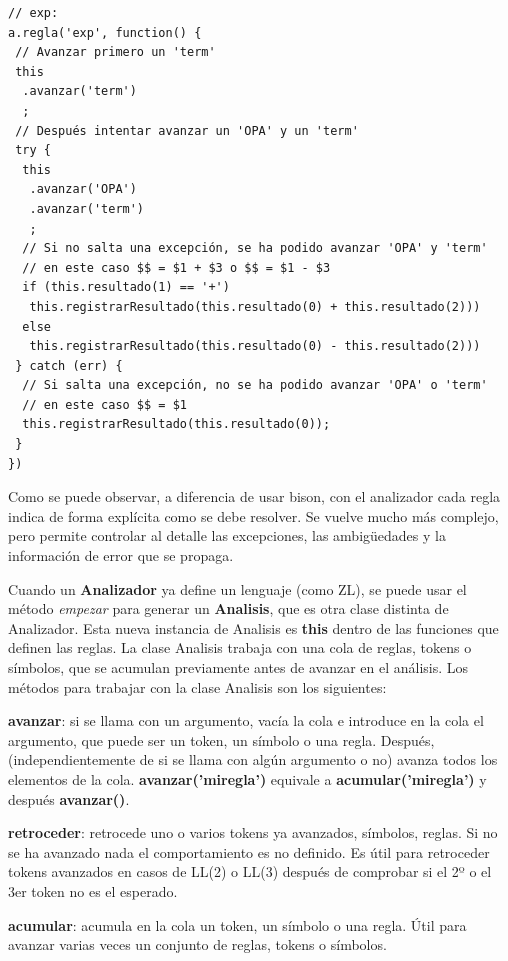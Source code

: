 \documentclass{report}
\begin{document}
	\begin{BVerbatim}
// exp:
a.regla('exp', function() {
 // Avanzar primero un 'term'
 this
  .avanzar('term')
  ;
 // Después intentar avanzar un 'OPA' y un 'term'
 try {
  this
   .avanzar('OPA')
   .avanzar('term')
   ;
  // Si no salta una excepción, se ha podido avanzar 'OPA' y 'term'
  // en este caso $$ = $1 + $3 o $$ = $1 - $3 
  if (this.resultado(1) == '+')
   this.registrarResultado(this.resultado(0) + this.resultado(2)))
  else
   this.registrarResultado(this.resultado(0) - this.resultado(2)))
 } catch (err) {
  // Si salta una excepción, no se ha podido avanzar 'OPA' o 'term'
  // en este caso $$ = $1
  this.registrarResultado(this.resultado(0));
 }
})
	\end{BVerbatim}
	
	Como se puede observar, a diferencia de usar bison, con el analizador cada regla indica de forma explícita como se debe resolver. Se vuelve mucho más complejo, pero permite controlar al detalle las excepciones, las ambigüedades y la información de error que se propaga. 
	
	\vspace{10px}
	
	Cuando un \textbf{Analizador} ya define un lenguaje (como ZL), se puede usar el método \textit{empezar} para generar un \textbf{Analisis}, que es otra clase distinta de Analizador. Esta nueva instancia de Analisis es \textbf{this} dentro de las funciones que definen las reglas. La clase Analisis trabaja con una cola de reglas, tokens o símbolos, que se acumulan previamente antes de avanzar en el análisis. Los métodos para trabajar con la clase Analisis son los siguientes:
	
	\vspace{10px}
	\noindent
	\textbf{avanzar}: si se llama con un argumento, vacía la cola e introduce en la cola el argumento, que puede ser un token, un símbolo o una regla. Después, (independientemente de si se llama con algún argumento o no) avanza todos los elementos de la cola. \textbf{avanzar('miregla')} equivale a \textbf{acumular('miregla')} y después \textbf{avanzar()}.
	
	\vspace{10px}
	\noindent
	\textbf{retroceder}: retrocede uno o varios tokens ya avanzados, símbolos, reglas. Si no se ha avanzado nada el comportamiento es no definido. Es útil para retroceder tokens avanzados en casos de LL(2) o LL(3) después de comprobar si el 2º o el 3er token no es el esperado. 
	
	\vspace{10px}
	\noindent
	\textbf{acumular}: acumula en la cola un token, un símbolo o una regla. Útil para avanzar varias veces un conjunto de reglas, tokens o símbolos.
	
\end{document}
